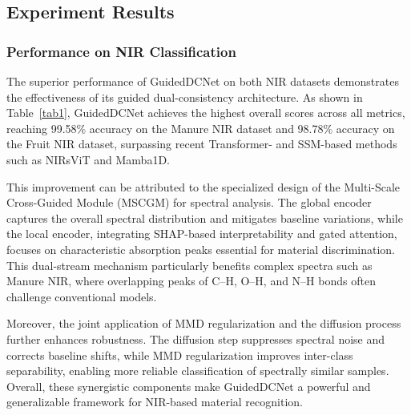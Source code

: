 \documentclass[a4paper,fleqn]{cas-sc}
\begin{document}
\subsection{Experiment Results}
\subsubsection{Performance on NIR Classification}

The superior performance of GuidedDCNet on both NIR datasets demonstrates the effectiveness of its guided dual-consistency architecture. As shown in Table~\ref{tab1}, GuidedDCNet achieves the highest overall scores across all metrics, reaching 99.58\% accuracy on the Manure NIR dataset and 98.78\% accuracy on the Fruit NIR dataset, surpassing recent Transformer- and SSM-based methods such as NIRsViT and Mamba1D.

This improvement can be attributed to the specialized design of the Multi-Scale Cross-Guided Module (MSCGM) for spectral analysis. The global encoder captures the overall spectral distribution and mitigates baseline variations, while the local encoder, integrating SHAP-based interpretability and gated attention, focuses on characteristic absorption peaks essential for material discrimination. This dual-stream mechanism particularly benefits complex spectra such as Manure NIR, where overlapping peaks of C–H, O–H, and N–H bonds often challenge conventional models.

Moreover, the joint application of MMD regularization and the diffusion process further enhances robustness. The diffusion step suppresses spectral noise and corrects baseline shifts, while MMD regularization improves inter-class separability, enabling more reliable classification of spectrally similar samples. Overall, these synergistic components make GuidedDCNet a powerful and generalizable framework for NIR-based material recognition.
\end{document}
